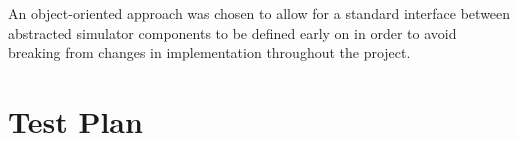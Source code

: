 \documentclass[]{report}   %
\begin{document}
An object-oriented approach was chosen to allow for a standard interface between abstracted simulator components to be defined early on in order to avoid breaking from changes in implementation throughout the project.

\chapter{Test Plan}

\end{document}
